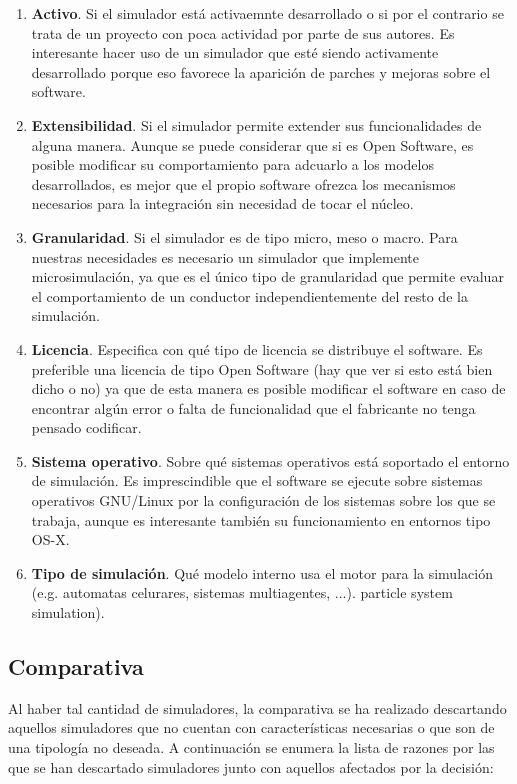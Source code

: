 \begin{enumerate}
	\item \textbf{Activo}. Si el simulador está activaemnte desarrollado o si por el contrario se trata de un proyecto con poca actividad por parte de sus autores. Es interesante hacer uso de un simulador que esté siendo activamente desarrollado porque eso favorece la aparición de parches y mejoras sobre el software.
	\item \textbf{Extensibilidad}. Si el simulador permite extender sus funcionalidades de alguna manera. Aunque se puede considerar que si es Open Software, es posible modificar su comportamiento para adcuarlo a los modelos desarrollados, es mejor que el propio software ofrezca los mecanismos necesarios para la integración sin necesidad de tocar el núcleo.
	\item \textbf{Granularidad}. Si el simulador es de tipo micro, meso o macro. Para nuestras necesidades es necesario un simulador que implemente microsimulación, ya que es el único tipo de granularidad que permite evaluar el comportamiento de un conductor independientemente del resto de la simulación.
	\item \textbf{Licencia}. Especifica con qué tipo de licencia se distribuye el software. Es preferible una licencia de tipo Open Software (\TODO hay que ver si esto está bien dicho o no) ya que de esta manera es posible modificar el software en caso de encontrar algún error o falta de funcionalidad que el fabricante no tenga pensado codificar.
	\item \textbf{Sistema operativo}. Sobre qué sistemas operativos está soportado el entorno de simulación. Es imprescindible que el software se ejecute sobre sistemas operativos GNU/Linux por la configuración de los sistemas sobre los que se trabaja, aunque es interesante también su funcionamiento en entornos tipo OS-X.
	\item \textbf{Tipo de simulación}. Qué modelo interno usa el motor para la simulación (e.g. automatas celurares, sistemas multiagentes, ...).
	particle system simulation).
\end{enumerate}

\subsection{Comparativa}

Al haber tal cantidad de simuladores, la comparativa se ha realizado descartando aquellos simuladores que no cuentan con características necesarias o que son de una tipología no deseada. A continuación se enumera la lista de razones por las que se han descartado simuladores junto con aquellos afectados por la decisión:

